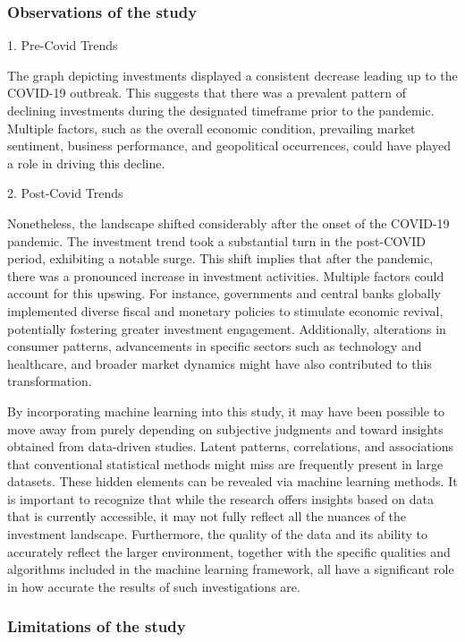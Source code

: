 \documentclass[12pt]{article}
\begin{document}
\subsubsection{Observations of the study}

1. Pre-Covid Trends

The graph depicting investments displayed a consistent decrease leading up to the COVID-19 outbreak. This suggests that there was a prevalent pattern of declining investments during the designated timeframe prior to the pandemic. Multiple factors, such as the overall economic condition, prevailing market sentiment, business performance, and geopolitical occurrences, could have played a role in driving this decline.


2. Post-Covid Trends

Nonetheless, the landscape shifted considerably after the onset of the COVID-19 pandemic. The investment trend took a substantial turn in the post-COVID period, exhibiting a notable surge. This shift implies that after the pandemic, there was a pronounced increase in investment activities. Multiple factors could account for this upswing. For instance, governments and central banks globally implemented diverse fiscal and monetary policies to stimulate economic revival, potentially fostering greater investment engagement. Additionally, alterations in consumer patterns, advancements in specific sectors such as technology and healthcare, and broader market dynamics might have also contributed to this transformation.

By incorporating machine learning into this study, it may have been possible to move away from purely depending on subjective judgments and toward insights obtained from data-driven studies. Latent patterns, correlations, and associations that conventional statistical methods might miss are frequently present in large datasets. These hidden elements can be revealed via machine learning methods. It is important to recognize that while the research offers insights based on data that is currently accessible, it may not fully reflect all the nuances of the investment landscape. Furthermore, the quality of the data and its ability to accurately reflect the larger environment, together with the specific qualities and algorithms included in the machine learning framework, all have a significant role in how accurate the results of such investigations are.

\subsubsection{Limitations of the study}
\end{document}
